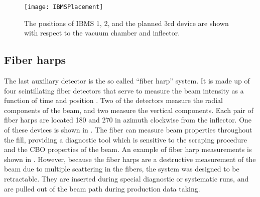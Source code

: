 \begin{figure}[]
    \centering
    \texttt{[image: IBMSPlacement]}
    \caption[IBMS Positions]{The positions of IBMS 1, 2, and the planned 3rd device are shown with respect to the vacuum chamber and inflector.}   
    \label{fig:IBMSPlacement}
\end{figure}



\subsection{Fiber harps}
\label{sec:FiberHarps}

The last auxiliary detector is the so called ``fiber harp'' system. It is made up of four scintillating fiber detectors that serve to measure the beam intensity as a function of time and position \cite{fiberharp}. Two of the detectors measure the radial components of the beam, and two measure the vertical components. Each pair of fiber harps are located 180\textdegree{} and 270\textdegree{} in azimuth clockwise from the inflector. One of these devices is shown in . The fiber can measure beam properties throughout the fill, providing a diagnostic tool which is sensitive to the scraping procedure and the CBO properties of the beam. An example of fiber harp measurements is shown in . However, because the fiber harps are a destructive measurement of the beam due to multiple scattering in the fibers, the system was designed to be retractable. They are inserted during special diagnostic or systematic runs, and are pulled out of the beam path during production data taking.





